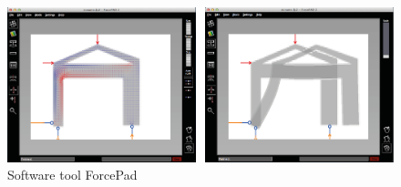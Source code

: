 \begin{figure}
  \includegraphics[width=380pt]{graphics/forcepad.png}
  \caption{Software tool ForcePad}
  \label{fig:forcepad}
\end{figure}

